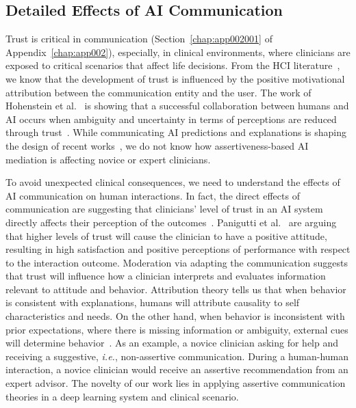 \subsection{Detailed Effects of AI Communication}
\label{sec:app005003004}

Trust is critical in communication (Section~\ref{chap:app002001} of Appendix~\ref{chap:app002}), especially, in clinical environments, where clinicians are exposed to critical scenarios that affect life decisions.
From the \ac{HCI} literature~\cite{10.1145/3479587, 10.1145/3334480.3375147, 10.1145/3334480.3382842}, we know that the development of trust is influenced by the positive motivational attribution between the communication entity and the user.
The work of Hohenstein et al.~\cite{HOHENSTEIN2020106190} is showing that a successful collaboration between humans and \ac{AI} occurs when ambiguity and uncertainty in terms of perceptions are reduced through trust~\cite{HOHENSTEIN2020106190}.
While communicating \ac{AI} predictions and explanations is shaping the design of recent works~\cite{Lundberg2020}, we do not know how assertiveness-based \ac{AI} mediation is affecting novice or expert clinicians.

To avoid unexpected clinical consequences, we need to understand the effects of \ac{AI} communication on human interactions.
In fact, the direct effects of communication are suggesting that clinicians' level of trust in an \ac{AI} system directly affects their perception of the outcomes~\cite{HOHENSTEIN2020106190}.
Panigutti et al.~\cite{10.1145/3491102.3502104} are arguing that higher levels of trust will cause the clinician to have a positive attitude, resulting in high satisfaction and positive perceptions of performance with respect to the interaction outcome.
Moderation via adapting the communication suggests that trust will influence how a clinician interprets and evaluates information relevant to attitude and behavior.
Attribution theory tells us that when behavior is consistent with explanations, humans will attribute causality to self characteristics and needs.
On the other hand, when behavior is inconsistent with prior expectations, where there is missing information or ambiguity, external cues will determine behavior~\cite{HOHENSTEIN2020106190}.
As an example, a novice clinician asking for help and receiving a suggestive, {\it i.e.}, non-assertive communication.
During a human-human interaction, a novice clinician would receive an assertive recommendation from an expert advisor.
The novelty of our work lies in applying assertive communication theories in a deep learning system and clinical scenario.

